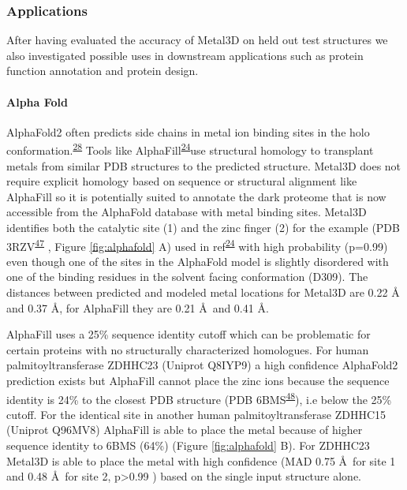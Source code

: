 \documentclass[ lineno,
  9pt]{elife}
\begin{document}
\hypertarget{applications}{%
\subsubsection{Applications}\label{applications}}

After having evaluated the accuracy of Metal3D on held out test structures we also investigated possible uses in downstream applications such as protein function annotation and protein design.

\hypertarget{alpha-fold}{%
\paragraph{Alpha Fold}\label{alpha-fold}}

AlphaFold2 often predicts side chains in metal ion binding sites in the holo conformation.\textsuperscript{\protect\hyperlink{ref-yZfcMIwh}{28}} Tools like AlphaFill\textsuperscript{\protect\hyperlink{ref-13fLqNwbD}{24}}use structural homology to transplant metals from similar PDB structures to the predicted structure. Metal3D does not require explicit homology based on sequence or structural alignment like AlphaFill so it is potentially suited to annotate the dark proteome that is now accessible from the AlphaFold database with metal binding sites. Metal3D identifies both the catalytic site (1) and the zinc finger (2) for the example (PDB 3RZV\textsuperscript{\protect\hyperlink{ref-wW700ShK}{47}} , Figure \ref{fig:alphafold} A) used in ref\textsuperscript{\protect\hyperlink{ref-13fLqNwbD}{24}} with high probability (p=0.99) even though one of the sites in the AlphaFold model is slightly disordered with one of the binding residues in the solvent facing conformation (D309). The distances between predicted and modeled metal locations for Metal3D are 0.22 \AA\, and 0.37 \AA , for AlphaFill they are 0.21 \AA\, and 0.41 \AA .

AlphaFill uses a 25\% sequence identity cutoff which can be problematic for certain proteins with no structurally characterized homologues. For human palmitoyltransferase ZDHHC23 (Uniprot Q8IYP9) a high confidence AlphaFold2 prediction exists but AlphaFill cannot place the zinc ions because the sequence identity is 24\% to the closest PDB structure (PDB 6BMS\textsuperscript{\protect\hyperlink{ref-RFwEiPTW}{48}}), i.e below the 25\% cutoff. For the identical site in another human palmitoyltransferase ZDHHC15 (Uniprot Q96MV8) AlphaFill is able to place the metal because of higher sequence identity to 6BMS (64\%) (Figure \ref{fig:alphafold} B). For ZDHHC23 Metal3D is able to place the metal with high confidence (MAD 0.75 \AA\, for site 1 and 0.48 \AA\, for site 2, p\textgreater0.99 ) based on the single input structure alone.
\end{document}
